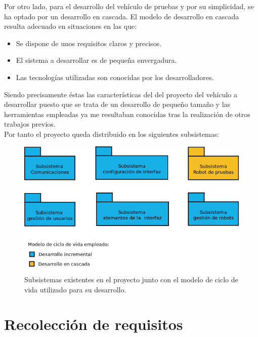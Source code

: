 Por otro lado, para el desarrollo del vehículo de pruebas y por su simplicidad, se ha optado por un desarrollo en cascada. El modelo de desarrollo en cascada resulta adecuado en situaciones
en las que:\\

\begin{itemize}
 \item Se dispone de unos requisitos claros y precisos.
 \item El sistema a desarrollar es de pequeña envergadura.
 \item Las tecnologías utilizadas son conocidas por los desarrolladores.
\end{itemize}

Siendo precisamente éstas las características del del proyecto del vehículo a desarrollar puesto que se trata de un desarrollo de pequeño tamaño y las herramientas empleadas ya me resultaban conocidas
tras la realización de otros trabajos previos.\\

Por tanto el proyecto queda distribuido en los siguientes subsistemas:\\

\begin{figure}[H]
  \begin{center}
    \includegraphics[scale=.6]{diagramas/subsistemas.png}
  \end{center}
  \caption{Subsistemas existentes en el proyecto junto con el modelo de ciclo de vida
utilizado para su desarrollo.}
  \label{website:pagina-principal}
\end{figure}


\section{Recolección de requisitos}

